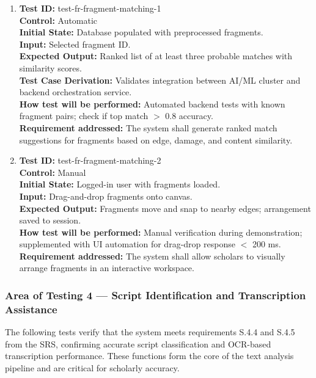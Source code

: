 \documentclass[12pt, titlepage]{article}
\begin{document}
\begin{enumerate}
\item
\textbf{Test ID:} test-fr-fragment-matching-1\\
\textbf{Control:} Automatic\\
\textbf{Initial State:} Database populated with preprocessed fragments.\\
\textbf{Input:} Selected fragment ID.\\
\textbf{Expected Output:} Ranked list of at least three probable matches with similarity scores.\\
\textbf{Test Case Derivation:} Validates integration between AI/ML cluster and backend orchestration service.\\
\textbf{How test will be performed:} Automated backend tests with known fragment pairs; check if top match $>$ 0.8 accuracy.\\
\textbf{Requirement addressed:} The system shall generate ranked match suggestions for fragments based on edge, damage, and content similarity.\\

\item
\textbf{Test ID:} test-fr-fragment-matching-2\\
\textbf{Control:} Manual\\
\textbf{Initial State:} Logged-in user with fragments loaded.\\
\textbf{Input:} Drag-and-drop fragments onto canvas.\\
\textbf{Expected Output:} Fragments move and snap to nearby edges; arrangement saved to session.\\
\textbf{How test will be performed:} Manual verification during demonstration; supplemented with UI automation for drag-drop response $<$ 200 ms.\\
\textbf{Requirement addressed:} The system shall allow scholars to visually arrange fragments in an interactive workspace.\\
\end{enumerate}


\subsubsection{Area of Testing 4 — Script Identification and Transcription Assistance}

The following tests verify that the system meets requirements S.4.4 and S.4.5 from the SRS, confirming accurate script classification and OCR-based transcription performance. These functions form the core of the text analysis pipeline and are critical for scholarly accuracy.
\end{document}
